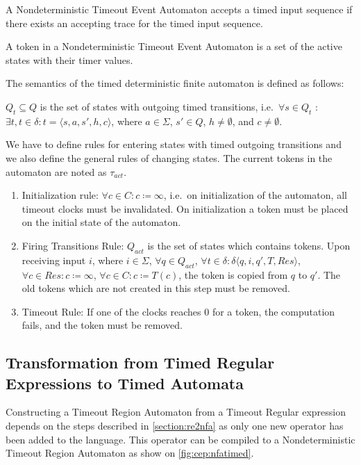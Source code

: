 				\begin{dfn}
					\label{dfn:cep:tea:accepting}
					A Nondeterministic Timeout Event Automaton accepts a timed input sequence if there exists an accepting trace for the timed input sequence.
				\end{dfn}
				
				\begin{dfn}
					\label{dfn:cep:tea:token}
					A token in a Nondeterministic Timeout Event Automaton is a set of the active states with their timer values.
				\end{dfn}
				
				The semantics of the timed deterministic finite automaton is defined as follows:
				
				
				$Q_t \subseteq Q$ is the set of states with outgoing timed transitions, 
				i.e.~$\forall s \in Q_t$ : $ \exists t, t \in \delta \colon t = \langle s, a, s', h, c \rangle$, where $a \in \Sigma$, $s' \in Q$, $h \neq \emptyset$, and $c \neq \emptyset$.
				
				We have to define rules for entering states with timed outgoing transitions and we also define the general rules of changing states. 
				The current tokens in the automaton are noted as $\tau_{act}$.
				
				\begin{enumerate}
					\item Initialization rule: 
						$\forall c \in C \colon c \coloneqq \infty$, i.e.~on initialization of the automaton, all timeout clocks must be invalidated.
						On initialization a token must be placed on the initial state of the automaton.
					\item Firing Transitions Rule:
						$Q_{act}$ is the set of states which contains tokens.
						Upon receiving input $i$, where $i \in \Sigma$, $\forall q \in Q_{act}$, $\forall t \in \delta \colon \delta \langle q, i, q', T, \mathit{Res} \rangle$,
						$\forall c \in \mathit{Res} \colon c \coloneqq \infty$,
						$\forall c \in C \colon c \coloneqq T(c)$,
						the token is copied from $q$ to $q'$.
						The old tokens which are not created in this step must be removed.
					\item Timeout Rule:
						If one of the clocks reaches 0 for a token, the computation fails, and the token must be removed.
				\end{enumerate}
	
		\subsection{Transformation from Timed Regular Expressions to Timed Automata}
			\label{section:tre2tnfa}	
			Constructing a Timeout Region Automaton from a Timeout Regular expression depends on the steps described in \cref{section:re2nfa} as only one new operator has been added to the language.
			This operator can be compiled to a Nondeterministic Timeout Region Automaton as show on \cref{fig:cep:nfatimed}. 
			
